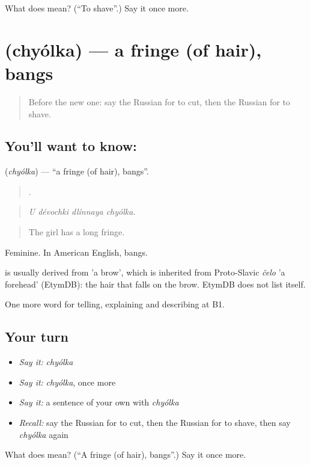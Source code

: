 \begin{tcolorbox}[breakable,colback=teal!4,colframe=teal!35!black,title={Before you move on}]
What does  mean? (\textquotedblleft{}To shave\textquotedblright{}.) Say it once more.
\end{tcolorbox}
\section[\texorpdfstring{\ru{чёлка} (chyólka)}{чёлка (chyólka)}]{ (chyólka) — a fringe (of hair), bangs}

\label{lesson:RU-C449-chyolka}



\begin{quote}
Before the new one: say the Russian for to cut, then the Russian for to shave.
\end{quote}

\subsection*{You'll want to know: }
\textbf{} (\emph{chyólka}) — \textquotedblleft{}a fringe (of hair), bangs\textquotedblright{}.

\begin{quote}
   .
\end{quote}

\begin{quote}
\emph{U dévochki dlínnaya chyólka.}
\end{quote}

\begin{quote}
The girl has a long fringe.
\end{quote}

Feminine. In American English, bangs.

\begin{cousinweb}
\emph{} is usually derived from \emph{} 'a brow', which is inherited from Proto-Slavic \emph{čelo} 'a forehead' (EtymDB): the hair that falls on the brow. EtymDB does not list \emph{} itself.
\end{cousinweb}

\begin{grammarlens}[title={What you've built}]
One more word for telling, explaining and describing at B1.
\end{grammarlens}

\subsection*{Your turn}
\begin{itemize}
\raggedright
  \item \emph{Say it:} \emph{chyólka}
  \item \emph{Say it:} \emph{chyólka}, once more
  \item \emph{Say it:} a sentence of your own with \emph{chyólka}
  \item \emph{Recall:} say the Russian for to cut, then the Russian for to shave, then say \emph{chyólka} again
\end{itemize}

\begin{tcolorbox}[breakable,colback=teal!4,colframe=teal!35!black,title={Before you move on}]
What does  mean? (\textquotedblleft{}A fringe (of hair), bangs\textquotedblright{}.) Say it once more.
\end{tcolorbox}
